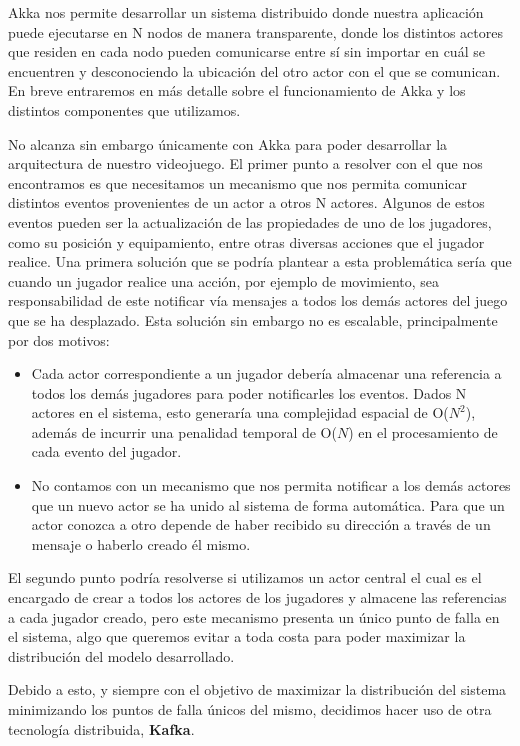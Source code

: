 Akka nos permite desarrollar un sistema distribuido
donde nuestra aplicación puede ejecutarse en N nodos de manera transparente, donde los distintos actores que residen en cada nodo
pueden comunicarse entre sí sin importar en cuál se encuentren y desconociendo la ubicación del otro actor con el que se comunican.
En breve entraremos en más detalle sobre el funcionamiento de Akka y los distintos componentes que utilizamos.

No alcanza sin embargo únicamente con Akka para poder desarrollar la arquitectura de nuestro videojuego.
El primer punto a resolver con el que nos encontramos es que necesitamos un mecanismo que nos permita comunicar distintos eventos
provenientes de un actor a otros N actores. Algunos de estos eventos pueden ser la actualización de las propiedades de uno de los jugadores,
como su posición y equipamiento, entre otras diversas acciones que el jugador realice. Una primera solución que se podría plantear a esta problemática sería que cuando un jugador realice una acción,
por ejemplo de movimiento, sea responsabilidad de este notificar vía mensajes a todos los demás actores del juego que se ha desplazado. Esta solución sin embargo no es escalable, principalmente por dos motivos:

\begin{itemize}
    \item Cada actor correspondiente a un jugador debería almacenar una referencia a todos los demás jugadores para poder notificarles los eventos.
    Dados N actores en el sistema, esto generaría una complejidad espacial de O($N^2$), además de incurrir una penalidad temporal de O($N$) en el procesamiento de cada evento
    del jugador.
    \item No contamos con un mecanismo que nos permita notificar a los demás actores que un nuevo actor se ha unido al sistema de forma automática.
    Para que un actor conozca a otro depende de haber recibido su dirección a través de un mensaje o haberlo creado él mismo.
\end{itemize}

El segundo punto podría resolverse si utilizamos un actor central el cual es el encargado de crear a todos los actores de los jugadores
y almacene las referencias a cada jugador creado, pero este mecanismo presenta un único punto de falla en el sistema, algo que queremos evitar a toda costa
para poder maximizar la distribución del modelo desarrollado.

Debido a esto, y siempre con el objetivo de maximizar la distribución del sistema minimizando los puntos de falla únicos del mismo,
decidimos hacer uso de otra tecnología distribuida, \textbf{Kafka}.

